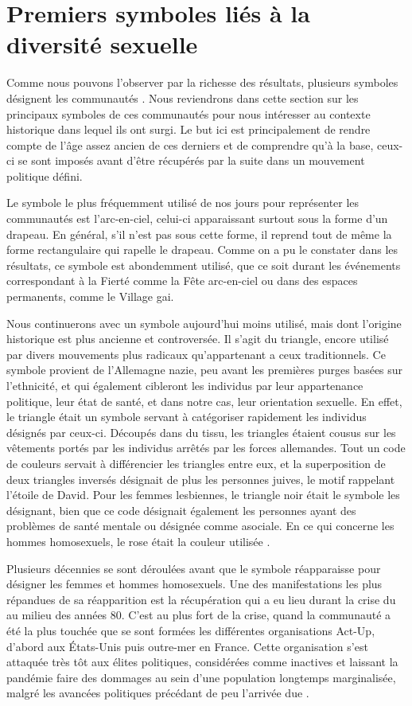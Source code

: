 \section{Premiers symboles liés à la diversité sexuelle}
\label{sec:premiers_symboles_li_s_la_diversit_sexuelle}
Comme nous pouvons l'observer par la richesse des résultats, plusieurs symboles désignent les communautés \lgbt{}.
Nous reviendrons dans cette section sur les principaux symboles de ces communautés pour nous intéresser au contexte historique dans lequel ils ont surgi.
Le but ici est principalement de rendre compte de l'âge assez ancien de ces derniers et de comprendre qu'à la base, ceux-ci se sont imposés avant d'être récupérés par la suite dans un mouvement politique défini.

Le symbole le plus fréquemment utilisé de nos jours pour représenter les communautés \lgbt{} est l'arc-en-ciel, celui-ci apparaissant surtout sous la forme d'un drapeau.
En général, s'il n'est pas sous cette forme, il reprend tout de même la forme rectangulaire qui rapelle le drapeau.
Comme on a pu le constater dans les résultats, ce symbole est abondemment utilisé, que ce soit durant les événements correspondant à la Fierté comme la Fête arc-en-ciel ou dans des espaces permanents, comme le Village gai.

Nous continuerons avec un symbole aujourd'hui moins utilisé, mais dont l'origine historique est plus ancienne et controversée.
Il s'agit du triangle, encore utilisé par divers mouvements plus radicaux qu'appartenant a ceux traditionnels.
Ce symbole provient de l'Allemagne nazie, peu avant les premières purges basées sur l'ethnicité, et qui également cibleront les individus par leur appartenance politique, leur état de santé, et dans notre cas, leur orientation sexuelle.
En effet, le triangle était un symbole servant à catégoriser rapidement les individus désignés par ceux-ci.
Découpés dans du tissu, les triangles étaient cousus sur les vêtements portés par les individus arrêtés par les forces allemandes.
Tout un code de couleurs servait à différencier les triangles entre eux, et la superposition de deux triangles inversés désignait de plus les personnes juives, le motif rappelant l'étoile de David.
Pour les femmes lesbiennes, le triangle noir était le symbole les désignant, bien que ce code désignait également les personnes ayant des problèmes de santé mentale ou désignée comme asociale.
En ce qui concerne les hommes homosexuels, le rose était la couleur utilisée \missref{}.

Plusieurs décennies se sont déroulées avant que le symbole réapparaisse pour désigner les femmes et hommes homosexuels.
Une des manifestations les plus répandues de sa réapparition est la récupération qui a eu lieu durant la crise du \vih{} au milieu des années 80.
C'est au plus fort de la crise, quand la communauté \lgbt{} a été la plus touchée que se sont formées les différentes organisations Act-Up, d'abord aux États-Unis puis outre-mer en France.
Cette organisation s'est attaquée très tôt aux élites politiques, considérées comme inactives et laissant la pandémie faire des dommages au sein d'une population longtemps marginalisée, malgré les avancées politiques précédant de peu l'arrivée due \vih{}.

